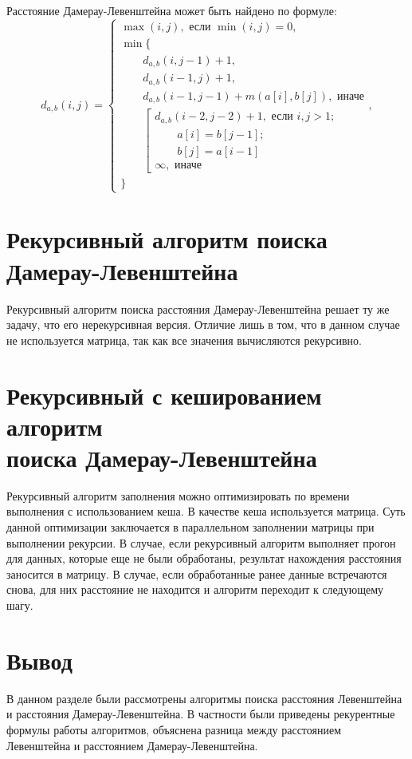 Расстояние Дамерау-Левенштейна может быть найдено по формуле:
\begin{equation}
	\label{eq:a}
	d_{a,b}(i, j) = \begin{cases}
		\max(i, j), \text{ если }\min(i, j) = 0,\\
		\min \lbrace \\
			\qquad d_{a,b}(i, j-1) + 1,\\
			\qquad d_{a,b}(i-1, j) + 1,\\
			\qquad d_{a,b}(i-1, j-1) + m(a[i], b[j]), \text{ иначе}\\
			\qquad \left[ \begin{array}{cc}d_{a,b}(i-2, j-2) + 1, \text{ если }i,j > 1;\\
			\qquad \text{}a[i] = b[j-1]; \\
			\qquad \text{}b[j] = a[i-1]\\
			\infty, \text{ иначе}\end{array}\right.\\
		\rbrace
		\end{cases},
\end{equation}

\section{Рекурсивный алгоритм поиска \\Дамерау-Левенштейна}
\label{sec:recmat}

Рекурсивный алгоритм поиска расстояния Дамерау-Левенштейна решает ту же задачу, что его нерекурсивная версия. Отличие лишь в том, что в данном случае не используется матрица, так как все значения вычисляются рекурсивно.   

\section{Рекурсивный с кешированием алгоритм \\ поиска Дамерау-Левенштейна}

Рекурсивный алгоритм заполнения можно оптимизировать по времени выполнения с использованием кеша. В качестве кеша используется матрица. Суть данной оптимизации заключается в параллельном заполнении матрицы при выполнении рекурсии. 
В случае, если рекурсивный алгоритм выполняет прогон для данных, которые еще не были обработаны, результат нахождения расстояния заносится в матрицу. В случае, если обработанные ранее данные встречаются снова, для них расстояние не находится и алгоритм переходит к следующему шагу.


\section*{Вывод}

В данном разделе были рассмотрены алгоритмы поиска расстояния Левенштейна и расстояния Дамерау-Левенштейна. В частности были приведены рекурентные формулы работы алгоритмов, объяснена разница между расстоянием Левенштейна и расстоянием Дамерау-Левенштейна.

